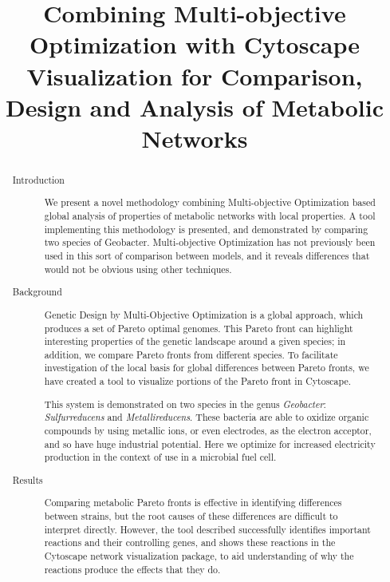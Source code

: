 \documentclass[a4paper]{article}
\begin{document}
\title{Combining Multi-objective Optimization with Cytoscape Visualization for Comparison, Design and Analysis of Metabolic Networks}
\maketitle
\begin{abstract}
\begin{description}
\item[]

\item[Introduction] 
We present a novel methodology combining Multi-objective Optimization based global analysis of properties of metabolic networks with local properties. A tool implementing this methodology is presented, and demonstrated by comparing two species of Geobacter. Multi-objective Optimization has not previously been used in this sort of comparison between models, and it reveals differences that would not be obvious using other techniques.

\item[Background]
Genetic Design by Multi-Objective Optimization is a global approach, which produces a set of Pareto optimal genomes. This Pareto front can highlight interesting properties of the genetic landscape around a given species; in addition, we compare Pareto fronts from different species. To facilitate investigation of the local basis for global  differences between Pareto fronts, we have created a tool to visualize portions of the Pareto front in Cytoscape.

This system is demonstrated on two species in the genus {\it Geobacter}: {\it Sulfurreducens} and {\it Metallireducens}. These bacteria are able to oxidize organic compounds by using metallic ions, or even electrodes, as the electron acceptor, and so have huge industrial potential. Here we optimize for increased electricity production in the context of use in a microbial fuel cell.

\item[Results]
Comparing metabolic Pareto fronts is effective in identifying differences between strains, but the root causes of these differences are difficult to interpret directly. However, the tool described successfully identifies important reactions and their controlling genes, and shows these reactions in the Cytoscape network visualization package, to aid understanding of why the reactions produce the effects that they do.


\end{description}
\end{abstract}
\end{document}
